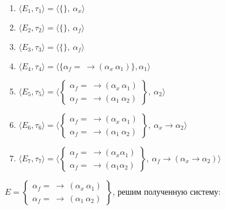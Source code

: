 \begin{enumerate}
	\item $\big\langle E_1, \tau_1\big\rangle=\big \langle \{\},\:\alpha_x \big \rangle$
	\item $\big\langle E_2, \tau_2\big\rangle=\big \langle \{\},\:\alpha_f \big \rangle$
	\item $\big\langle E_3, \tau_3\big\rangle=\big \langle \{\},\:\alpha_f \big \rangle$
	\item $\big\langle E_4, \tau_4\big\rangle=\big \langle \{\alpha_f=\:\rightarrow(\alpha_x\:\alpha_1)\}, \alpha_1 \big \rangle$
	\item $\big\langle E_5, \tau_5\big\rangle=\big \langle \begin{Bmatrix}
	\alpha_f=\:\rightarrow(\alpha_x\:\alpha_1)\\
	\alpha_f=\:\rightarrow(\alpha_1\:\alpha_2)
\end{Bmatrix},\:\alpha_2 \big \rangle$
	\item $\big\langle E_6, \tau_6\big\rangle=\big \langle \begin{Bmatrix}\alpha_f=\:\rightarrow(\alpha_x\:\alpha_1)\\ \alpha_f=\:\rightarrow(\alpha_1\:\alpha_2)\end{Bmatrix},\:\alpha_x\rightarrow\alpha_2 \big \rangle$
	\item $\big\langle E_7, \tau_7\big\rangle=\big \langle \begin{Bmatrix}\alpha_f=\:\rightarrow(\alpha_x\alpha_1)\\ \alpha_f=\:\rightarrow(\alpha_1\alpha_2)\end{Bmatrix},\:\alpha_f\rightarrow(\alpha_x\rightarrow\alpha_2) \big \rangle$
\end{enumerate}
	$E=\begin{Bmatrix}\alpha_f=\:\rightarrow\:(\alpha_x\:\alpha_1)\\ \alpha_f=\:\rightarrow\:(\alpha_1\:\alpha_2)\end{Bmatrix}$, решим полученную систему:\par 
